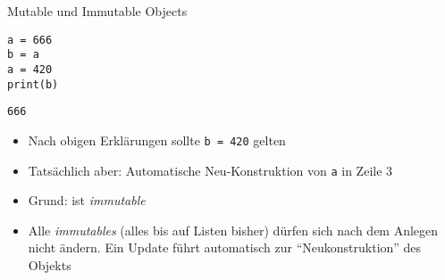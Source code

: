 
\begin{frame}[fragile]{Mutable und Immutable Objects}
%
\begin{tcbraster}[raster columns=2,
                  raster equal height,
                  nobeforeafter,
                  raster column skip=0.5cm]
\begin{codebox}
\begin{verbatim}
a = 666
b = a
a = 420
print(b)
\end{verbatim}
\end{codebox}
%
\begin{cmdbox}[Ausgabe]
\begin{verbatim}
666
\end{verbatim}
\end{cmdbox}
\end{tcbraster}
%
\begin{itemize}
\item Nach obigen Erklärungen sollte \texttt{b = 420} gelten
\item Tatsächlich aber: Automatische Neu-Konstruktion von \texttt{a} in Zeile 3
\item Grund:  ist \emph{immutable}
\item Alle \emph{immutables} (alles bis auf Listen bisher) dürfen sich nach dem Anlegen nicht ändern. Ein Update führt automatisch zur \enquote{Neukonstruktion} des Objekts
\end{itemize}
%
\end{frame}


